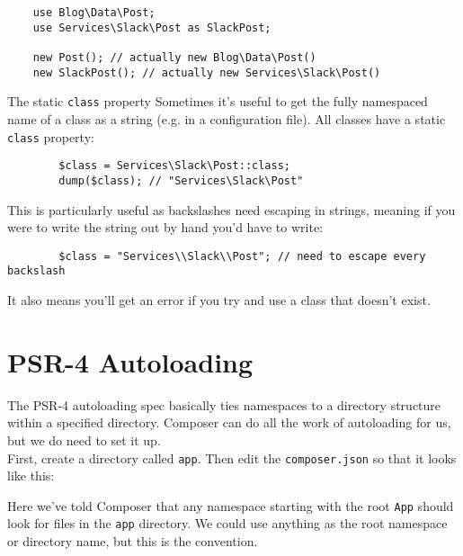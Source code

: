 \begin{verbatim}
    use Blog\Data\Post;
    use Services\Slack\Post as SlackPost;

    new Post(); // actually new Blog\Data\Post()
    new SlackPost(); // actually new Services\Slack\Post()
\end{verbatim}


\pagebreak

\begin{infobox}{The static \texttt{class} property}
    Sometimes it's useful to get the fully namespaced name of a class as a string (e.g. in a configuration file). All classes have a static \texttt{class} property:

    \begin{verbatim}
        $class = Services\Slack\Post::class;
        dump($class); // "Services\Slack\Post"
    \end{verbatim}

    This is particularly useful as backslashes need escaping in strings, meaning if you were to write the string out by hand you'd have to write:

    \begin{verbatim}
        $class = "Services\\Slack\\Post"; // need to escape every backslash
    \end{verbatim}

    It also means you'll get an error if you try and use a class that doesn't exist.
\end{infobox}




\section{PSR-4 Autoloading}

The PSR-4 autoloading spec basically ties namespaces to a directory structure within a specified directory. Composer can do all the work of autoloading for us, but we do need to set it up.
\\

First, create a directory called \texttt{app}. Then edit the \texttt{composer.json} so that it looks like this:


Here we've told Composer that any namespace starting with the root \texttt{App} should look for files in the \texttt{app} directory. We could use anything as the root namespace or directory name, but this is the convention.
\\

